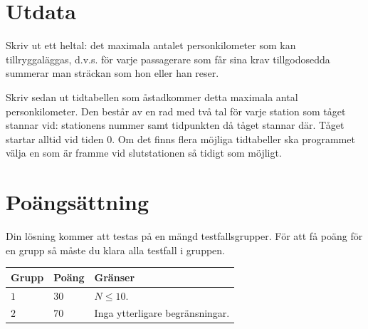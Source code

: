 \section*{Utdata}
Skriv ut ett heltal: det maximala antalet personkilometer som kan tillryggaläggas, d.v.s. för varje
passagerare som får sina krav tillgodosedda summerar man sträckan som hon eller han reser. 

Skriv sedan ut tidtabellen som åstadkommer detta maximala antal personkilometer. Den består
av en rad med två tal för varje station som tåget stannar vid: stationens nummer samt tidpunkten då
tåget stannar där. Tåget startar alltid vid tiden 0. Om det finns flera möjliga tidtabeller ska
programmet välja en som är framme vid slutstationen så tidigt som möjligt.

\section*{Poängsättning}
Din lösning kommer att testas på en mängd testfallsgrupper.
För att få poäng för en grupp så måste du klara alla testfall i gruppen.

\noindent
\begin{tabular}{| l | l | p{12cm} |}
  \hline
  \textbf{Grupp} & \textbf{Poäng} & \textbf{Gränser} \\ \hline
  $1$    & $30$        & $N \leq 10$. \\ \hline 
  $2$    & $70$        & Inga ytterligare begränsningar. \\ \hline 
\end{tabular}
